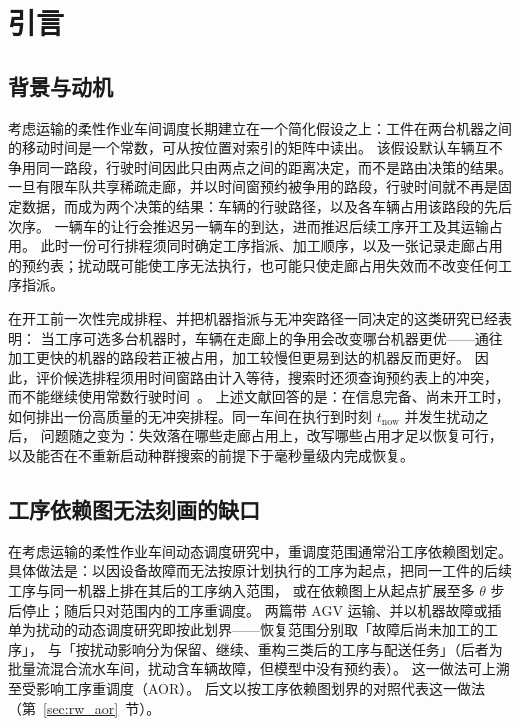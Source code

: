 \documentclass[manuscript,screen,review]{acmart}
\begin{document}
\maketitle

\section{引言}
\label{sec:introduction}

\subsection{背景与动机}

考虑运输的柔性作业车间调度长期建立在一个简化假设之上：工件在两台机器之间的移动时间是一个常数，可从按位置对索引的矩阵中读出。
该假设默认车辆互不争用同一路段，行驶时间因此只由两点之间的距离决定，而不是路由决策的结果。
一旦有限车队共享稀疏走廊，并以时间窗预约被争用的路段，行驶时间就不再是固定数据，而成为两个决策的结果：车辆的行驶路径，以及各车辆占用该路段的先后次序。
一辆车的让行会推迟另一辆车的到达，进而推迟后续工序开工及其运输占用。
此时一份可行排程须同时确定工序指派、加工顺序，以及一张记录走廊占用的预约表；扰动既可能使工序无法执行，也可能只使走廊占用失效而不改变任何工序指派。

在开工前一次性完成排程、并把机器指派与无冲突路径一同决定的这类研究已经表明：
当工序可选多台机器时，车辆在走廊上的争用会改变哪台机器更优——通往加工更快的机器的路段若正被占用，加工较慢但更易到达的机器反而更好。
因此，评价候选排程须用时间窗路由计入等待，搜索时还须查询预约表上的冲突，
而不能继续使用常数行驶时间~\cite{vanos2026exact,li2026framework,sun2023integrated}。
上述文献回答的是：在信息完备、尚未开工时，如何排出一份高质量的无冲突排程。同一车间在执行到时刻 \(t_{\mathrm{now}}\) 并发生扰动之后，
问题随之变为：失效落在哪些走廊占用上，改写哪些占用才足以恢复可行，以及能否在不重新启动种群搜索的前提下于毫秒量级内完成恢复。

\subsection{工序依赖图无法刻画的缺口}

在考虑运输的柔性作业车间动态调度研究中，重调度范围通常沿工序依赖图划定。
具体做法是：以因设备故障而无法按原计划执行的工序为起点，把同一工件的后续工序与同一机器上排在其后的工序纳入范围，
或在依赖图上从起点扩展至多 \(\theta\) 步后停止；随后只对范围内的工序重调度。
两篇带 AGV 运输、并以机器故障或插单为扰动的动态调度研究即按此划界——恢复范围分别取「故障后尚未加工的工序」\cite{zhang2023energy}，
与「按扰动影响分为保留、继续、重构三类后的工序与配送任务」\cite{tang2026dynamic}（后者为批量流混合流水车间，扰动含车辆故障，但模型中没有预约表）。
这一做法可上溯至受影响工序重调度（AOR）\cite{zhang2023energy,tang2026dynamic}。
后文以按工序依赖图划界的对照代表这一做法（第~\ref{sec:rw_aor}~节）。
\end{document}
